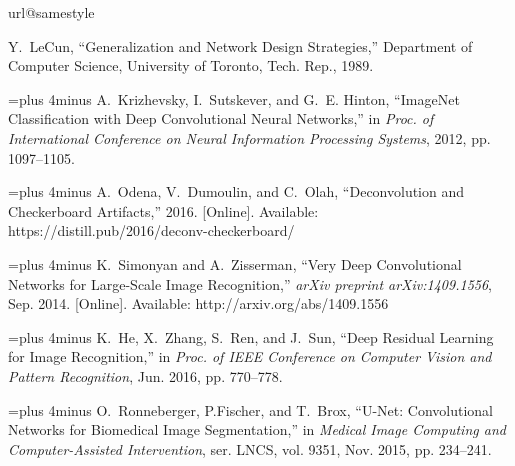 \documentclass{article}
\begin{document}
\begin{thebibliography}{10}
\providecommand{\url}[1]{#1}
\csname url@samestyle\endcsname
\providecommand{\newblock}{\relax}
\providecommand{\bibinfo}[2]{#2}
\providecommand{\BIBentrySTDinterwordspacing}{\spaceskip=0pt\relax}
\providecommand{\BIBentryALTinterwordstretchfactor}{4}
\providecommand{\BIBentryALTinterwordspacing}{\spaceskip=\fontdimen2\font plus
\BIBentryALTinterwordstretchfactor\fontdimen3\font minus
  \fontdimen4\font\relax}
\providecommand{\BIBforeignlanguage}[2]{{\expandafter\ifx\csname l@#1\endcsname\relax
\typeout{** WARNING: IEEEtran.bst: No hyphenation pattern has been}\typeout{** loaded for the language `#1'. Using the pattern for}\typeout{** the default language instead.}\else
\language=\csname l@#1\endcsname
\fi
#2}}
\providecommand{\BIBdecl}{\relax}
\BIBdecl

Y.~LeCun, ``{Generalization and Network Design Strategies},'' Department of
  Computer Science, University of Toronto, Tech. Rep., 1989.

\BIBentryALTinterwordspacing
A.~Krizhevsky, I.~Sutskever, and G.~E. Hinton, ``{ImageNet Classification with
  Deep Convolutional Neural Networks},'' in \emph{Proc. of International
  Conference on Neural Information Processing Systems},
  2012, pp. 1097--1105.
\BIBentrySTDinterwordspacing

\BIBentryALTinterwordspacing
A.~Odena, V.~Dumoulin, and C.~Olah, ``{Deconvolution and Checkerboard
  Artifacts},'' 2016. [Online]. Available:
  \url{https://distill.pub/2016/deconv-checkerboard/}
\BIBentrySTDinterwordspacing

\BIBentryALTinterwordspacing
K.~Simonyan and A.~Zisserman, ``{Very Deep Convolutional Networks for
  Large-Scale Image Recognition},'' \emph{arXiv preprint arXiv:1409.1556}, Sep.
  2014. [Online]. Available: \url{http://arxiv.org/abs/1409.1556}
\BIBentrySTDinterwordspacing

\BIBentryALTinterwordspacing
K.~He, X.~Zhang, S.~Ren, and J.~Sun, ``{Deep Residual Learning for Image
  Recognition},'' in \emph{Proc. of IEEE Conference on Computer Vision and Pattern
  Recognition}, Jun. 2016, pp. 770--778.
\BIBentrySTDinterwordspacing

\BIBentryALTinterwordspacing
O.~Ronneberger, P.Fischer, and T.~Brox, ``{U-Net: Convolutional Networks for
  Biomedical Image Segmentation},'' in \emph{Medical Image Computing and
  Computer-Assisted Intervention}, ser. LNCS, vol. 9351,
  Nov. 2015, pp. 234--241.
\BIBentrySTDinterwordspacing


\end{thebibliography}
\end{document}
